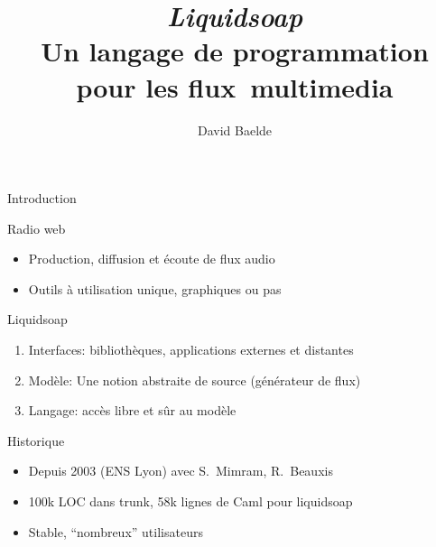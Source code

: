 \documentclass{beamer}
\title{\emph{\LARGE Liquidsoap} \\
  Un langage de programmation \\ pour les flux~multimedia}
\date{David Baelde} %
\renewcommand{\emph}[1]{\alert{#1}}
\begin{document}
\begin{frame}
  \maketitle
\end{frame}

\begin{frame}{Introduction}

  \begin{block}{Radio web}
  \begin{itemize}
  \item \emph{Production}, diffusion et écoute de flux audio
  \item Outils à \emph{utilisation unique}, graphiques ou pas
  \end{itemize}
  \end{block}

  \begin{block}{Liquidsoap}
  \begin{enumerate}
  \item Interfaces: bibliothèques, applications externes et distantes
  \item Modèle: Une notion abstraite de source (générateur de flux)
  \item \emph{Langage}: accès libre et sûr au modèle
  \end{enumerate}
  \end{block}

  \begin{block}{Historique}
  \begin{itemize}
  \item Depuis 2003 (ENS Lyon) avec S.~Mimram, R.~Beauxis
  \item 100k LOC dans trunk, 58k lignes de Caml pour liquidsoap
  \item Stable, ``nombreux'' utilisateurs
  \end{itemize}
  \end{block}

\end{frame}


\end{document}
